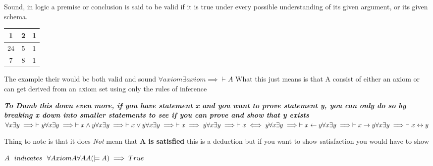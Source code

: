 \documentclass{article}
\theoremstyle{mytheoremstyle}
\theoremstyle{mytheoremstyle}
\theoremstyle{myproblemstyle}
\begin{document}
\begin{definition}
    Sound, in logic a premise or conclusion is said to be valid if it is true under every possible understanding of its given argument, or its given schema.
        \begin{center}
          \begin{tabular}{ c c c }
            1 & 2 & 1 \\
            \hline
            24 & 5 & 1  \\
            \hline
            7 & 8 & 1
          \end{tabular}
        \end{center}

        The example their would be both valid and sound
        \begin{math}
            \forall axiom \exists axiom \implies \vdash A
        \end{math}
        What this just means is that A consist of either an axiom or can get derived from an axiom set using only the rules of inference

        \textbf{\textit{To Dumb this down even more, if you have statement x and you want to prove statement y, you can only do so by breaking x down into smaller statements to see if you can prove and show that y exists}}
        \\
        \begin{math}
            \forall x \exists y \implies \vdash y  \\
            \forall x \exists y \implies \vdash x \land y \\
            \forall x \exists y \implies \vdash x \lor y \\
            \forall x \exists y \implies \vdash x \implies y \\
            \forall x \exists y \implies \vdash x \iff y \\
            \forall x \exists y \implies \vdash x \leftarrow y \\
            \forall x \exists y \implies \vdash x \rightarrow y \\
            \forall x \exists y \implies \vdash x \leftrightarrow y \\
        \end{math}

        Thing to note is that it does \textit{Not} mean that \textbf{A is satisfied} this is a deduction but if you want to show satisfaction you would have to show

        \begin{math}
            A \ \ indicates \ \ \forall Axiom A \\
            \forall A A(\models A) \implies True
        \end{math}

\end{definition}
\end{document}
